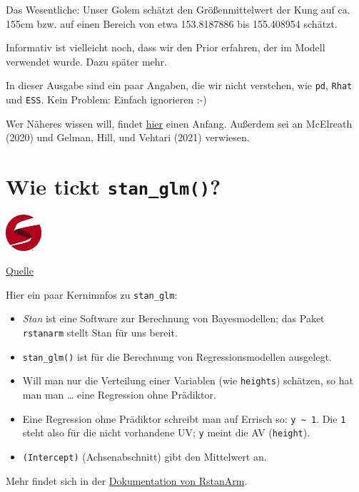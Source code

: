 \documentclass[
  a4paper,
  DIV=11]{scrreprt}
\providecommand{\tightlist}{%
  \setlength{\itemsep}{0pt}\setlength{\parskip}{0pt}}\usepackage{longtable,booktabs,array}
\theoremstyle{definition}
\theoremstyle{remark}
\begin{document}
Das Wesentliche: Unser Golem schätzt den Größenmittelwert der Kung auf
ca. 155cm bzw. auf einen Bereich von etwa 153.8187886 bis 155.408954
schätzt.

Informativ ist vielleicht noch, dass wir den Prior erfahren, der im
Modell verwendet wurde. Dazu später mehr.

In dieser Ausgabe sind ein paar Angaben, die wir nicht verstehen, wie
\texttt{pd}, \texttt{Rhat} und \texttt{ESS}. Kein Problem: Einfach
ignorieren :-)

Wer Näheres wissen will, findet \href{}{hier} einen Anfang. Außerdem sei
an McElreath (2020) und Gelman, Hill, und Vehtari (2021) verwiesen.

\hypertarget{wie-tickt-stan_glm}{%
\section{\texorpdfstring{Wie tickt
\texttt{stan\_glm()}?}{Wie tickt stan\_glm()?}}\label{wie-tickt-stan_glm}}

\includegraphics[width=0.1\textwidth,height=\textheight]{./img/stanlogo.png}

\href{https://mc-stan.org/}{Quelle}

Hier ein paar Kernimnfos zu \texttt{stan\_glm}:

\begin{itemize}
\tightlist
\item
  \emph{Stan} ist eine Software zur Berechnung von Bayesmodellen; das
  Paket \texttt{rstanarm} stellt Stan für uns bereit.
\item
  \texttt{stan\_glm()} ist für die Berechnung von Regressionsmodellen
  ausgelegt.
\item
  Will man nur die Verteilung einer Variablen (wie \texttt{heights})
  schätzen, so hat man man \ldots{} eine Regression ohne Prädiktor.
\item
  Eine Regression ohne Prädiktor schreibt man auf Errisch so:
  \texttt{y\ \textasciitilde{}\ 1}. Die \texttt{1} steht also für die
  nicht vorhandene UV; \texttt{y} meint die AV (\texttt{height}).
\item
  \texttt{(Intercept)} (Achsenabschnitt) gibt den Mittelwert an.
\end{itemize}

Mehr findet sich in der
\href{https://mc-stan.org/rstanarm/}{Dokumentation von RstanArm}.
\end{document}

